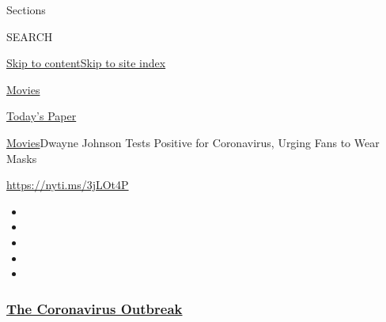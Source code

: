 Sections

SEARCH

\protect\hyperlink{site-content}{Skip to
content}\protect\hyperlink{site-index}{Skip to site index}

\href{https://www.nytimes3xbfgragh.onion/section/movies}{Movies}

\href{https://myaccount.nytimes3xbfgragh.onion/auth/login?response_type=cookie\&client_id=vi}{}

\href{https://www.nytimes3xbfgragh.onion/section/todayspaper}{Today's
Paper}

\href{/section/movies}{Movies}\textbar{}Dwayne Johnson Tests Positive
for Coronavirus, Urging Fans to Wear Masks

\url{https://nyti.ms/3jLOt4P}

\begin{itemize}
\item
\item
\item
\item
\item
\end{itemize}

\hypertarget{the-coronavirus-outbreak}{%
\subsubsection{\texorpdfstring{\href{https://www.nytimes3xbfgragh.onion/news-event/coronavirus?name=styln-coronavirus-national\&region=TOP_BANNER\&block=storyline_menu_recirc\&action=click\&pgtype=Article\&impression_id=493ac1d0-f27e-11ea-8ef7-cd06f6acdb7f\&variant=undefined}{The
Coronavirus
Outbreak}}{The Coronavirus Outbreak}}\label{the-coronavirus-outbreak}}

